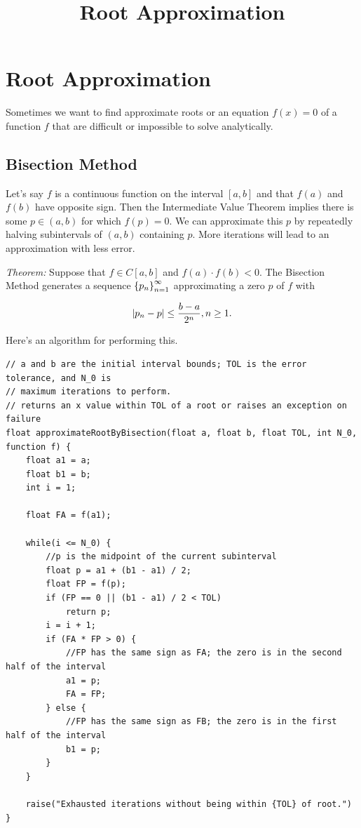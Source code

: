 \documentclass{article}
\title{Root Approximation}
\begin{document}
\section{Root Approximation}

Sometimes we want to find approximate roots or an equation $f(x) = 0$ of a function $f$ that are difficult or impossible to solve analytically.

\subsection{Bisection Method}

Let's say $f$ is a \@{continuous} function on the \@{interval} $[a, b]$ and that $f(a)$ and $f(b)$ have opposite sign. Then the Intermediate Value Theorem implies there is some $p \in (a,b)$ for which $f(p) = 0.$ We can approximate this $p$ by repeatedly halving subintervals of $(a,b)$ containing $p.$ More iterations will lead to an approximation with less error.

\emph{Theorem:} Suppose that $f \in C[a, b]$ and $f(a) \cdot f(b) < 0.$ The Bisection Method generates a \@{sequence} $\left\{ p_n \right\}_{n=1}^{\infty}$ approximating a zero $p$ of $f$ with

\[ \left| p_n - p \right| \leq \frac{b - a}{2^n}, n \geq 1. \]

Here's an algorithm for performing this.

\begin{verbatim}
// a and b are the initial interval bounds; TOL is the error tolerance, and N_0 is
// maximum iterations to perform.
// returns an x value within TOL of a root or raises an exception on failure
float approximateRootByBisection(float a, float b, float TOL, int N_0, function f) {
    float a1 = a;
    float b1 = b;
    int i = 1;

    float FA = f(a1);

    while(i <= N_0) {
        //p is the midpoint of the current subinterval
        float p = a1 + (b1 - a1) / 2;
        float FP = f(p);
        if (FP == 0 || (b1 - a1) / 2 < TOL)
            return p;
        i = i + 1;
        if (FA * FP > 0) {
            //FP has the same sign as FA; the zero is in the second half of the interval
            a1 = p;
            FA = FP;
        } else {
            //FP has the same sign as FB; the zero is in the first half of the interval
            b1 = p;
        }
    }

    raise("Exhausted iterations without being within {TOL} of root.")
}
\end{verbatim}
\end{document}
